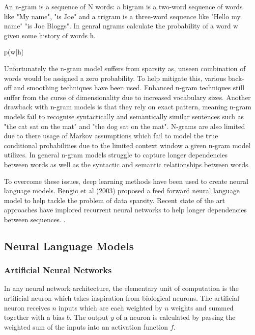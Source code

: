 \noindent
\newline
An n-gram is a sequence of N words: a bigram is a two-word sequence of words like "My name", "is Joe" and a trigram is a three-word sequence like "Hello my name" "is Joe Bloggs". In genral ngrams calculate the probability of a word w given some history of words h. 

p(w|h)

\noindent
\newline
Unfortunately the n-gram model suffers from sparsity as, unseen combination of words would be assigned a zero probability. To help mitigate this, various back-off and smoothing techniques have been used. Enhanced n-gram techniques still suffer from the curse of dimensionality due to increased vocabulary sizes. Another drawback with n-gram models is that they rely on exact pattern, meaning n-gram models fail to recognise syntactically and semantically similar sentences such as "the cat sat on the mat" and "the dog sat on the mat". N-grams are also limited due to there usage of Markov assumptions which fail to model the true conditional probabilities due to the limited context window a given n-gram model utilizes. In general n-gram models struggle to capture longer dependencies between words as well as the syntactic and semantic relationships between words. 

\noindent
\newline
To overcome these issues, deep learning methods have been used to create neural language models. Bengio et al (2003) proposed a feed forward neural language model to help tackle the problem of data sparsity. Recent state of the art approaches have implored recurrent neural networks to help longer dependencies between sequences.
. 



\subsection{Neural Language Models}
\subsubsection{Artificial Neural Networks}
In any neural network architecture, the elementary unit of computation is the artificial neuron which takes inspiration from biological neurons. The artificial neuron receives \(n\) inputs which are each weighted by \(n\) weights and summed together with a bias \(b\). The output \(y\) of a neuron is calculated by passing the weighted sum of the inputs into an activation function \(f\). 

